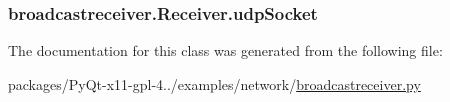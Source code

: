\subsubsection[{udp\+Socket}]{\setlength{\rightskip}{0pt plus 5cm}broadcastreceiver.\+Receiver.\+udp\+Socket}\label{classbroadcastreceiver_1_1Receiver_a6ff8448876ac3020f74c2020649d074d}


The documentation for this class was generated from the following file\+:\begin{DoxyCompactItemize}
\item 
packages/\+Py\+Qt-\/x11-\/gpl-\/4../examples/network/\hyperlink{broadcastreceiver_8py}{broadcastreceiver.\+py}\end{DoxyCompactItemize}
